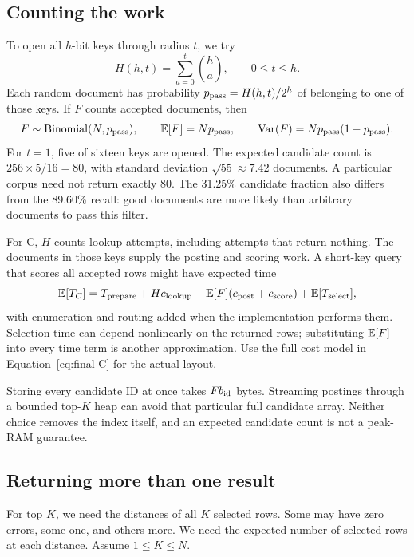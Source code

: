 \subsection{Counting the work}
To open all $h$-bit keys through radius $t$, we try
\begin{equation}
H(h,t)=\sum_{a=0}^{t}\binom{h}{a},\qquad 0\le t\le h.
\label{eq:teaching-keys}
\end{equation}
Each random document has probability $p_{\rm pass}=H(h,t)/2^h$ of belonging to one of those keys.
If $F$ counts accepted documents, then
\begin{equation}
F\sim\operatorname{Binomial}(N,p_{\rm pass}),\qquad
\mathbb E[F]=Np_{\rm pass},\qquad
\operatorname{Var}(F)=Np_{\rm pass}(1-p_{\rm pass}).
\label{eq:teaching-candidates}
\end{equation}
For $t=1$, five of sixteen keys are opened. The expected candidate count is
$256\times5/16=80$, with standard deviation $\sqrt{55}\approx7.42$ documents. A particular
corpus need not return exactly 80. The 31.25\% candidate fraction also differs from the 89.60\%
recall: good documents are more likely than arbitrary documents to pass this filter.

For C, $H$ counts lookup attempts, including attempts that return nothing. The documents in
those keys supply the posting and scoring work. A short-key query that scores all accepted
rows might have expected time
\[
\mathbb E[T_C]=T_{\rm prepare}+Hc_{\rm lookup}
       +\mathbb E[F](c_{\rm post}+c_{\rm score})+\mathbb E[T_{\rm select}],
\]
with enumeration and routing added when the implementation performs them. Selection time can
depend nonlinearly on the returned rows; substituting $\mathbb E[F]$ into every time term is another
approximation. Use the full cost model in Equation~\eqref{eq:final-C} for the actual layout.

Storing every candidate ID at once takes $F b_{\rm id}$ bytes. Streaming postings through a
bounded top-$K$ heap can avoid that particular full candidate array. Neither choice removes
the index itself, and an expected candidate count is not a peak-RAM guarantee.

\subsection{Returning more than one result}
For top $K$, we need the distances of all $K$ selected rows. Some may have zero errors,
some one, and others more. We need the expected number of selected rows at each distance.
Assume $1\le K\le N$.

